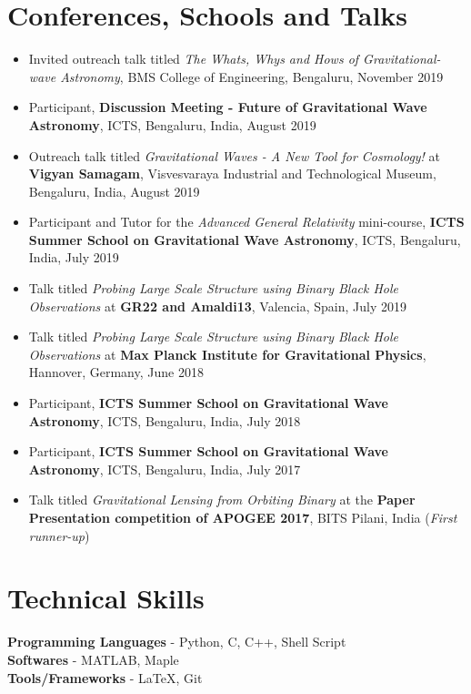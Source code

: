 \documentclass[margin, centered]{res}
\begin{document}
\begin{resume}
\section{Conferences, Schools and Talks}
\begin{itemize}[leftmargin=*]
 \item Invited outreach talk titled \textit{The Whats, Whys and Hows of Gravitational-wave Astronomy}, BMS College of Engineering, Bengaluru, November 2019
 \item Participant, \textbf{Discussion Meeting - Future of Gravitational Wave Astronomy}, ICTS, Bengaluru, India, August 2019
 \item Outreach talk titled \textit{Gravitational Waves - A New Tool for Cosmology!} at \textbf{Vigyan Samagam}, Visvesvaraya Industrial and Technological Museum, Bengaluru, India, August 2019
 \item Participant and Tutor for the \textit{Advanced General Relativity} mini-course, \textbf{ICTS Summer School on Gravitational Wave Astronomy}, ICTS, Bengaluru, India, July 2019
 \item Talk titled \textit{Probing Large Scale Structure using Binary Black Hole Observations} at \textbf{GR22 and Amaldi13}, Valencia, Spain, July 2019
 \item Talk titled \textit{Probing Large Scale Structure using Binary Black Hole Observations} at \textbf{Max Planck Institute for Gravitational Physics}, Hannover, Germany, June 2018
 \item Participant, \textbf{ICTS Summer School on Gravitational Wave Astronomy}, ICTS, Bengaluru, India, July 2018
 \item Participant, \textbf{ICTS Summer School on Gravitational Wave Astronomy}, ICTS, Bengaluru, India, July 2017
 \item Talk titled \textit{Gravitational Lensing from Orbiting Binary} at the \textbf{Paper Presentation competition of APOGEE 2017}, BITS Pilani, India (\textit{First runner-up})
 \end{itemize}
\section{Technical \hspace{2mm} Skills}
\textbf{Programming Languages} - Python, C, C++, Shell Script\\
\textbf{Softwares} - MATLAB, Maple \\
\textbf{Tools/Frameworks} - \LaTeX, Git


\end{resume}
\end{document}
